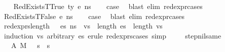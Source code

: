 \begin{isabellebody}
\isamarkupfalse%
\isanewline
\ \ \isamarkupfalse%
\ {\isacharparenleft}{\kern0pt}RedExistsT{\isacharunderscore}{\kern0pt}True\ ty\ e\ n{\isacharunderscore}{\kern0pt}s{\isacharparenright}{\kern0pt}\isanewline
\ \ \isamarkupfalse%
\ {\isacharquery}{\kern0pt}case\ \isamarkupfalse%
\ {\isacharparenleft}{\kern0pt}blast\ elim{\isacharcolon}{\kern0pt}\ red{\isacharunderscore}{\kern0pt}expr{\isachardot}{\kern0pt}cases{\isacharparenright}{\kern0pt}\isanewline
{}\isamarkupfalse%
\isanewline
\ \ \isamarkupfalse%
\ {\isacharparenleft}{\kern0pt}RedExistsT{\isacharunderscore}{\kern0pt}False\ e\ n{\isacharunderscore}{\kern0pt}s{\isacharparenright}{\kern0pt}\isanewline
\ \ \isamarkupfalse%
\ {\isacharquery}{\kern0pt}case\ \isamarkupfalse%
\ {\isacharparenleft}{\kern0pt}blast\ elim{\isacharcolon}{\kern0pt}\ red{\isacharunderscore}{\kern0pt}expr{\isachardot}{\kern0pt}cases{\isacharparenright}{\kern0pt}\ \ \ \ \isanewline
{}\isamarkupfalse%
%
\endisatagproof
{\isafoldproof}%
%
\isadelimproof
\isanewline
%
\endisadelimproof
\isanewline
{}\isamarkupfalse%
\ red{\isacharunderscore}{\kern0pt}exprs{\isacharunderscore}{\kern0pt}length{\isacharcolon}{\kern0pt}\ {\isachardoublequoteopen}{\isasymLambda}{\isacharcomma}{\kern0pt}{\isasymGamma}{\isacharcomma}{\kern0pt}{\isasymOmega}\ {\isasymturnstile}\ {\isasymlangle}es{\isacharcomma}{\kern0pt}\ n{\isacharunderscore}{\kern0pt}s{\isasymrangle}\ {\isacharbrackleft}{\kern0pt}{\isasymDown}{\isacharbrackright}{\kern0pt}\ vs\ {\isasymLongrightarrow}\ length\ es\ {\isacharequal}{\kern0pt}\ length\ vs{\isachardoublequoteclose}\isanewline
%
\isadelimproof
\ \ %
\endisadelimproof
%
\isatagproof
{}\isamarkupfalse%
\ {\isacharparenleft}{\kern0pt}induction\ vs\ arbitrary{\isacharcolon}{\kern0pt}\ es{\isacharsemicolon}{\kern0pt}\ erule\ red{\isacharunderscore}{\kern0pt}exprs{\isachardot}{\kern0pt}cases{\isacharsemicolon}{\kern0pt}\ simp{\isacharparenright}{\kern0pt}%
\endisatagproof
{\isafoldproof}%
%
\isadelimproof
\isanewline
%
\endisadelimproof
\ \ \ \isanewline
{}\isamarkupfalse%
\ step{\isacharunderscore}{\kern0pt}nil{\isacharunderscore}{\kern0pt}same{\isacharcolon}{\kern0pt}\isanewline
\ \ \ A{}{\isacharcolon}{\kern0pt}\ {\isachardoublequoteopen}M{\isacharcomma}{\kern0pt}{\isasymLambda}{\isacharcomma}{\kern0pt}{\isasymGamma}{\isacharcomma}{\kern0pt}{\isasymOmega}\ {\isasymturnstile}\ {\isasymlangle}{\isacharbrackleft}{\kern0pt}{\isacharbrackright}{\kern0pt}{\isacharcomma}{\kern0pt}\ s{\isasymrangle}\ {\isacharbrackleft}{\kern0pt}{\isasymrightarrow}{\isacharbrackright}{\kern0pt}\ s{\isacharprime}{\kern0pt}{\isacharprime}{\kern0pt}{\isachardoublequoteclose}\isanewline

\end{isabellebody}
